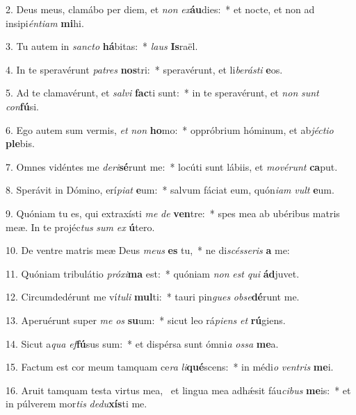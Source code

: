2. Deus meus, clamábo per diem, et \textit{non} \textit{ex}\textbf{áu}dies:~*  et nocte, et non ad insipi\textit{én}\textit{ti}\textit{am} \textbf{mi}hi.\

3. Tu autem in \textit{sanc}\textit{to} \textbf{há}bitas:~*  \textit{laus} \textbf{Is}raël.\

4. In te speravérunt \textit{pa}\textit{tres} \textbf{nos}tri:~*  speravérunt, et li\textit{be}\textit{rás}\textit{ti} \textbf{e}os.\

5. Ad te clamavérunt, et \textit{sal}\textit{vi} \textbf{fac}ti sunt:~*  in te speravérunt, et \textit{non} \textit{sunt} \textit{con}\textbf{fú}si.\

6. Ego autem sum vermis, \textit{et} \textit{non} \textbf{ho}mo:~*  oppróbrium hóminum, et ab\textit{jéc}\textit{ti}\textit{o} \textbf{ple}bis.\

7. Omnes vidéntes me \textit{de}\textit{ri}\textbf{sé}runt me:~*  locúti sunt lábiis, et \textit{mo}\textit{vé}\textit{runt} \textbf{ca}put.\

8. Sperávit in Dómino, erí\textit{pi}\textit{at} \textbf{e}um:~*  salvum fáciat eum, quón\textit{i}\textit{am} \textit{vult} \textbf{e}um.\

9. Quóniam tu es, qui extraxísti \textit{me} \textit{de} \textbf{ven}tre:~*  spes mea ab ubéribus matris meæ. In te projéc\textit{tus} \textit{sum} \textit{ex} \textbf{ú}tero.\

10. De ventre matris meæ Deus \textit{me}\textit{us} \textbf{es} tu,~*  ne di\textit{scés}\textit{se}\textit{ris} \textbf{a} me:\

11. Quóniam tribulátio \textit{pró}\textit{xi}\textbf{ma} est:~*  quóniam \textit{non} \textit{est} \textit{qui} \textbf{ád}juvet.\

12. Circumdedérunt me ví\textit{tu}\textit{li} \textbf{mul}ti:~*  tauri pin\textit{gues} \textit{ob}\textit{se}\textbf{dé}runt me.\

13. Aperuérunt super \textit{me} \textit{os} \textbf{su}um:~*  sicut leo rá\textit{pi}\textit{ens} \textit{et} \textbf{rú}giens.\

14. Sicut a\textit{qua} \textit{ef}\textbf{fú}sus sum:~*  et dispérsa sunt ómni\textit{a} \textit{os}\textit{sa} \textbf{me}a.\

15. Factum est cor meum tamquam ce\textit{ra} \textit{li}\textbf{qué}scens:~*  in médi\textit{o} \textit{ven}\textit{tris} \textbf{me}i.\

16. Aruit tamquam testa virtus mea, \dag\  et lingua mea adhǽsit fáu\textit{ci}\textit{bus} \textbf{me}is:~*  et in púlverem mor\textit{tis} \textit{de}\textit{du}\textbf{xís}ti me.\

